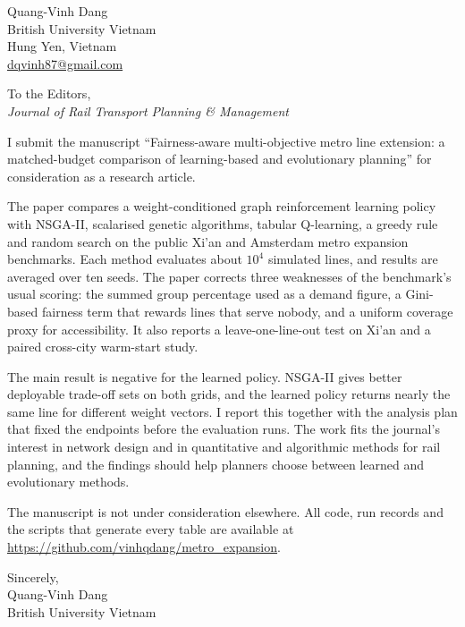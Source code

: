 \documentclass[11pt,a4paper]{article}
\begin{document}
\noindent
Quang-Vinh Dang\\
British University Vietnam\\
Hung Yen, Vietnam\\
\url{dqvinh87@gmail.com}

\vspace{1em}
\noindent
To the Editors,\\
\emph{Journal of Rail Transport Planning \& Management}

\vspace{1em}
\noindent
I submit the manuscript ``Fairness-aware multi-objective metro line extension: a matched-budget comparison of learning-based and evolutionary planning'' for consideration as a research article.

The paper compares a weight-conditioned graph reinforcement learning policy with NSGA-II, scalarised genetic algorithms, tabular Q-learning, a greedy rule and random search on the public Xi'an and Amsterdam metro expansion benchmarks. Each method evaluates about $10^4$ simulated lines, and results are averaged over ten seeds. The paper corrects three weaknesses of the benchmark's usual scoring: the summed group percentage used as a demand figure, a Gini-based fairness term that rewards lines that serve nobody, and a uniform coverage proxy for accessibility. It also reports a leave-one-line-out test on Xi'an and a paired cross-city warm-start study.

The main result is negative for the learned policy. NSGA-II gives better deployable trade-off sets on both grids, and the learned policy returns nearly the same line for different weight vectors. I report this together with the analysis plan that fixed the endpoints before the evaluation runs. The work fits the journal's interest in network design and in quantitative and algorithmic methods for rail planning, and the findings should help planners choose between learned and evolutionary methods.

The manuscript is not under consideration elsewhere. All code, run records and the scripts that generate every table are available at \url{https://github.com/vinhqdang/metro_expansion}.

\vspace{1em}
\noindent
Sincerely,\\[2em]
Quang-Vinh Dang\\
British University Vietnam
\end{document}
